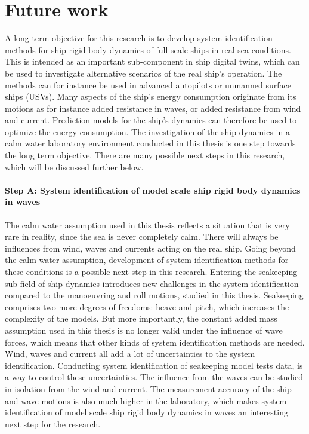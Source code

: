 \chapter{Future work\label{ch:future_work}}
A long term objective for this research is to develop system identification methods for ship rigid body dynamics of full scale ships in real sea conditions. This is intended as an important sub-component in ship digital twins, which can be used to investigate alternative scenarios of the real ship's operation. The methods can for instance be used in advanced autopilots or unmanned surface ships (USVs). Many aspects of the ship's energy consumption originate from its motions as for instance added resistance in waves, or added resistance from wind and current. Prediction models for the ship's dynamics can therefore be used to optimize the energy consumption. The investigation of the ship dynamics in a calm water laboratory environment conducted in this thesis is one step towards the long term objective. There are many possible next steps in this research, which will be discussed further below.  

\subsubsection*{Step A: System identification of model scale ship rigid body dynamics in waves}
The calm water assumption used in this thesis reflects a situation that is very rare in reality, since the sea is never completely calm. There will always be influences from wind, waves and currents acting on the real ship. Going beyond the calm water assumption, development of system identification methods for these conditions is a possible next step in this research. Entering the seakeeping sub field of ship dynamics introduces new challenges in the system identification compared to the manoeuvring and roll motions, studied in this thesis. Seakeeping comprises two more degrees of freedoms: heave and pitch, which increases the complexity of the models. But more importantly, the constant added mass assumption used in this thesis is no longer valid under the influence of wave forces, which means that other kinds of system identification methods are needed. Wind, waves and current all add a lot of uncertainties to the system identification. Conducting system identification of seakeeping model tests data, is a way to control these uncertainties. The influence from the waves can be studied in isolation from the wind and current. The measurement accuracy of the ship and wave motions is also much higher in the laboratory, which makes system identification of model scale ship rigid body dynamics in waves an interesting next step for the research.  

